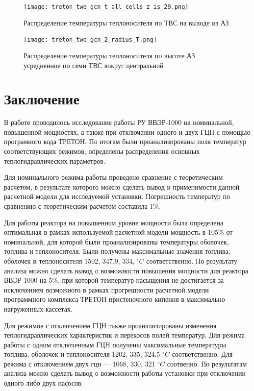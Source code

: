 \begin{figure}[H]
	\begin{center}
		\texttt{[image: treton\_two\_gcn\_t\_all\_cells\_z\_is\_29.png]}
		\caption{Распределение температуры теплоносителя по ТВС на выходе из АЗ}
		\label{pic:treton-two-gcn-t-all-cells-z-is-29}
	\end{center}
\end{figure}


\begin{figure}[H]
	\begin{center}
		\texttt{[image: treton\_two\_gcn\_2\_radius\_T.png]}
		\caption{Распределение температуры теплоносителя по высоте АЗ усредненное по семи ТВС вокруг центральной}
		\label{pic:treton-two-gcn-2-radius-T}
	\end{center}
\end{figure}

\section{Заключение}
В работе проводилось исследование работы РУ ВВЭР-1000 на номинальной, повышенной мощностях, а также при отключении одного и двух ГЦН с помощью програмного кода ТРЕТОН. По итогам были проанализированы поля температур соответствующих режимов, определены распределения основных теплогидравлических параметров. 

Для номинального режима работы проведено сравнение с теоретическим расчетом, в результате которого можно сделать вывод и применимости данной расчетной модели для исследуемой установки. Погрешность температур по сравнению с теоретическим расчетом составила 1\%.

Для работы реактора на повышенном уровне мощности была определена оптимальная в рамках используемой расчетной модели мощность в 105\% от номинальной, для которой были проанализированы температуры оболочек, топлива и теплоносителя. Были получены максимальные значения топлива, оболочек и теплоносителя 1502, 347.9, 334, $^\circ C$ соответственно. По результату анализа можно сделать вывод о возможности повышения мощности для реактора ВВЭР-1000 на 5\%, при которой температур насыщения не достигается за исключением возможного в рамках прогрешности расчетной модели программного комплекса ТРЕТОН пристеночного кипения в максимально нагруженных кассетах.

Для режимов с отключением ГЦН также проанализированы изменения теплогидравлических характеристик и перекосов полей температур. Для режима работы с одним отключенным ГЦН получены максимальные температуры топлива, оболочек и теплоносителя 1202, 335, 324.5 $^\circ C$ соответственно. Для режима с отключением двух гцн — 1068, 330, 321 $^\circ C$ соотвенно. По результатам анализа можно сделать вывод о возможности работы установки при отключении одного либо двух насосов.
